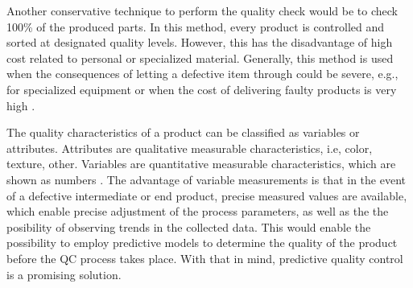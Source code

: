 \documentclass[5p,times,procedia]{elsarticle}
\begin{document}
Another conservative technique to perform the quality check would be to check 100\% of the produced parts. In this method, every product is controlled and sorted at designated quality levels. However, this has the disadvantage of high cost related to personal or specialized material. Generally, this method is used when the consequences of letting a defective item through could be severe, e.g., for specialized equipment or when the cost of delivering faulty products is very high \cite{Hinckley1997QC}.






The quality characteristics of a product can be classified as variables or attributes.
Attributes are qualitative measurable characteristics, i.e, color, texture, other. Variables are quantitative measurable characteristics, which are shown as numbers \cite{mitra2016fundamentals}. 
The advantage of variable measurements is that in the event of a defective intermediate or end product, precise measured values are available, which enable precise adjustment of the process parameters, as well as the the posibility of observing trends in the collected data. This would enable the possibility to employ predictive models to determine the quality of the product before the QC process takes place. With that in mind, predictive quality control is a promising solution.
\end{document}
